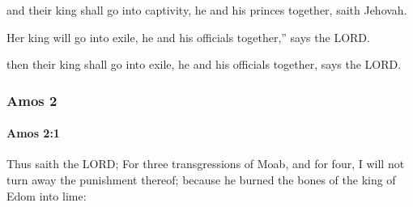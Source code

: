 			\begin{versebox}
					\item[BHS] 
					\item[LXX] 
					\item[ASV] and their king shall go into captivity, he and his princes together, saith Jehovah.
					\item[NIV] Her king will go into exile, he and his officials together,” says the LORD.
					\item[NRSV] then their king shall go into exile, he and his officials together, says the LORD.
			\end{versebox}
	\subsubsection{Amos 2} %
		\label{AMOS-2}

		\paragraph{Amos 2:1} %
			\label{AMOS-2-1}

			Thus saith the LORD; For three transgressions of Moab, and for four, I will not turn away the punishment thereof; because he burned the bones of the king of Edom into lime:

